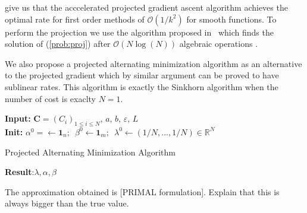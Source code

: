 \cite{beck2009fast,tseng2008accelerated} give us that the acccelerated projected gradient ascent algorithm achieves the optimal rate for first order methods of $\mathcal{O}(1/k^2)$ for smooth functions. To perform the projection we use the algorithm proposed in~\cite{shalev2006efficient} which finds the solution of (\ref{prob:proj}) after $\mathcal{O}(N\log(N))$ algebraic operations \citep{wang2013projection}.


We also propose a projected alternating minimization algorithm as an alternative to the projected gradient which by similar argument can be proved to have sublinear rates. This algorithm is exactly the Sinkhorn algorithm when the number of cost is exaclty $N=1$.
\begin{algorithm}[H]
\SetAlgoLined
\textbf{Input:} $\mathbf{C}=(C_i)_{1\leq i\leq N}$, $a$, $b$, $\varepsilon$, $L$\\
\textbf{Init:} $\alpha^0= \leftarrow \mathbf{1}_n\text{;  }$ $\beta^0 \leftarrow \mathbf{1}_m\text{;  }$ $\lambda^0 \leftarrow (1/N,...,1/N)\in\mathbb{R}^N$\\
\caption{Projected Alternating Minimization Algorithm}
\textbf{Result}:$\lambda,\alpha,\beta$
\end{algorithm}


The approximation obtained is [PRIMAL formulation]. Explain that this is always bigger than the true value. 
